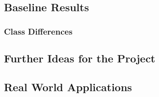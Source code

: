 \subsection{Baseline Results}\label{subsec:baseline-results}
\subsubsection{Class Differences}\label{subsec:class-differences}
\subsection{Further Ideas for the Project}\label{subsec:further-ideas}
\subsection{Real World Applications}\label{subsec:real-world-applications}

